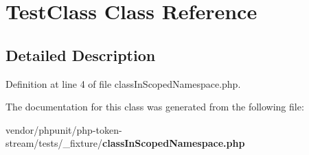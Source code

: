 \section{Test\+Class Class Reference}
\label{class_foo_1_1_bar_scoped_1_1_test_class}


\subsection{Detailed Description}


Definition at line 4 of file class\+In\+Scoped\+Namespace.\+php.



The documentation for this class was generated from the following file\+:\begin{DoxyCompactItemize}
\item 
vendor/phpunit/php-\/token-\/stream/tests/\+\_\+fixture/{\bf class\+In\+Scoped\+Namespace.\+php}\end{DoxyCompactItemize}
